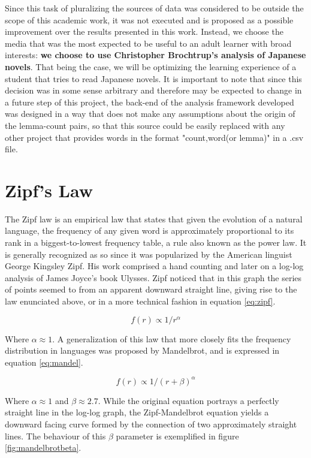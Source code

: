 Since this task of pluralizing the sources of data was considered to be outside the scope of this academic work, it was not executed and is proposed as a possible improvement over the results presented in this work. Instead, we choose the media that was the most expected to be useful to an adult learner with broad interests: \textbf{we choose to use Christopher Brochtrup's analysis of Japanese novels}. That being the case, we will be optimizing the learning experience of a student that tries to read Japanese novels. It is important to note that since this decision was in some sense arbitrary and therefore may be expected to change in a future step of this project, the back-end of the analysis framework developed was designed in a way that does not make any assumptions about the origin of the lemma-count pairs, so that this source could be easily replaced with any other project that provides words in the format "count,word(or lemma)" in a .csv file.

\section{Zipf's Law}
The Zipf law is an empirical law that states that given the evolution of a natural language, the frequency of any given word is approximately proportional to its rank in a biggest-to-lowest frequency table, a rule also known as the power law. It is generally recognized as so since it was popularized by the American linguist George Kingsley Zipf\cite{zipf1935psycho}. His work comprised a hand counting and later on a log-log analysis of James Joyce's book Ulysses. Zipf noticed that in this graph the series of points seemed to from an apparent downward straight line, giving rise to the law enunciated above, or in a more technical fashion in equation \ref{eq:zipf}.

\begin{equation}\label{eq:zipf}
    f(r)\propto1/r^\alpha
\end{equation}

Where \(\alpha \approx 1\). A generalization of this law that more closely fits the frequency distribution in languages was proposed by Mandelbrot\cite{mandelbrot1962paretian}, and is expressed in equation \ref{eq:mandel}.

\begin{equation}\label{eq:mandel}
    f(r)\propto1/(r+\beta)^\alpha
\end{equation}

Where \(\alpha \approx 1\) and \(\beta \approx 2.7\). While the original equation portrays a perfectly straight line in the log-log graph, the Zipf-Mandelbrot equation yields a downward facing curve formed by the connection of two approximately straight lines. The behaviour of this \(\beta\) parameter is exemplified in figure \ref{fig:mandelbrotbeta}.

